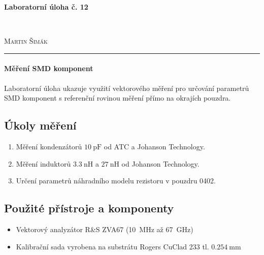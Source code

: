\documentclass[11pt,a4paper]{article}
\begin{document}

\begin{center}
    {\LARGE\textbf{Laboratorní úloha č. 12}}\\[3mm]
    \begin{minipage}{0.4\textwidth}
        \begin{flushleft}
            \textsc{}
        \end{flushleft}
    \end{minipage}
    ~
    \begin{minipage}{0.4\textwidth}
        \begin{flushright}
            \textsc{Martin Šimák}
        \end{flushright}
    \end{minipage}
    \noindent\rule{14.5cm}{0.4pt}
\end{center}

\paragraph*{Měření SMD komponent} Laboratorní úloha ukazuje využití vektorového měření pro určování parametrů SMD komponent s referenční rovinou měření přímo na okrajích pouzdra.

\subsection*{Úkoly měření}
\begin{enumerate}
    \item Měření kondenzátorů $10\ \mathrm{pF}$ od ATC a Johanson Technology.
    \item Měření induktorů $3.3\ \mathrm{nH}$ a $27\ \mathrm{nH}$ od Johanson Technology.
    \item Určení parametrů náhradního modelu rezistoru v pouzdru 0402.
\end{enumerate}

\subsection*{Použité přístroje a komponenty}
\begin{itemize}
    \item Vektorový analyzátor R\&S ZVA67 (10~MHz až 67~GHz)
    \item Kalibrační sada vyrobena na substrátu Rogers CuClad 233 tl. $0.254\ \mathrm{mm}$
\end{itemize}
\end{document}
